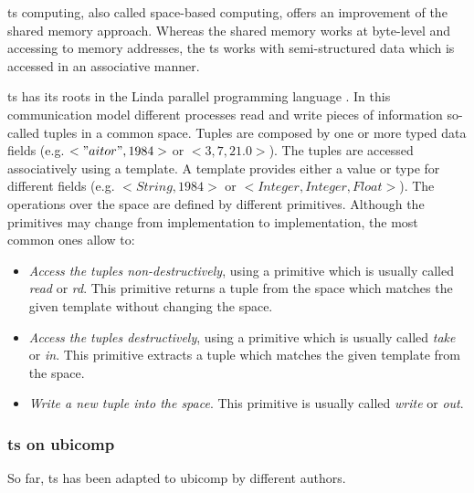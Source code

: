 

\acl{ts} computing, also called space-based computing, offers an improvement of the shared memory approach.
Whereas the shared memory works at byte-level and accessing to memory addresses,
the \acl{ts} works with semi-structured data which is accessed in an associative manner.

\acf{ts} has its roots in the Linda parallel programming language \citep{gelernter_generative_1985}.
In this communication model different processes read and write pieces of information so-called tuples in a common space.
Tuples are composed by one or more typed data fields (e.g. $<"aitor",1984>$ or $<3,7,21.0>$).
The tuples are accessed associatively using a template.
A template provides either a value or type for different fields (e.g. $<String,1984>$ or $<Integer, Integer, Float>$).
The operations over the space are defined by different primitives.
Although the primitives may change from implementation to implementation, the most common ones allow to:

\begin{itemize}
  \item \emph{Access the tuples non-destructively}, using a primitive which is usually called \emph{read} or \emph{rd}.
	This primitive returns a tuple from the space which matches the given template without changing the space.
  \item \emph{Access the tuples destructively}, using a primitive which is usually called \emph{take} or \emph{in}.
	This primitive extracts a tuple which matches the given template from the space.
  \item \emph{Write a new tuple into the space}. This primitive is usually called \emph{write} or \emph{out}.
\end{itemize}



\subsubsection{\acs{ts} on \acs{ubicomp}}
So far, \acl{ts} has been adapted to \acl{ubicomp} by different authors.

